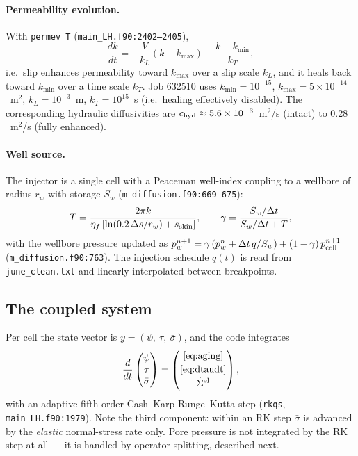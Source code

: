 \documentclass[11pt]{article}
\newcommand{\code}[1]{\texttt{#1}}
\newcommand{\sigeff}{\bar{\sigma}}
\newcommand{\sigtot}{\Sigma}
\begin{document}
\paragraph{Permeability evolution.} With \code{permev T}
(\code{main\_LH.f90:2402--2405}),
\begin{equation}
  \frac{dk}{dt} = -\frac{V}{k_L}\left(k - k_{\max}\right)
                  - \frac{k - k_{\min}}{k_T},
  \label{eq:permev}
\end{equation}
i.e.\ slip enhances permeability toward $k_{\max}$ over a slip scale $k_L$,
and it heals back toward $k_{\min}$ over a time scale $k_T$. Job 632510 uses
$k_{\min}=10^{-15}$, $k_{\max}=5\times10^{-14}$~m$^2$, $k_L=10^{-3}$~m,
$k_T=10^{15}$~s (i.e.\ healing effectively disabled). The corresponding
hydraulic diffusivities are $c_{\rm hyd}\approx 5.6\times10^{-3}$~m$^2$/s
(intact) to $0.28$~m$^2$/s (fully enhanced).

\paragraph{Well source.} The injector is a single cell with a Peaceman
well-index coupling to a wellbore of radius $r_w$ with storage $S_w$
(\code{m\_diffusion.f90:669--675}):
\begin{equation}
  T = \frac{2\pi k}{\eta_f\left[\ln(0.2\,\Delta s/r_w) + s_{\rm skin}\right]},
  \qquad
  \gamma = \frac{S_w/\Delta t}{S_w/\Delta t + T},
\end{equation}
with the wellbore pressure updated as
$p_w^{n+1} = \gamma\left(p_w^{n} + \Delta t\, q/S_w\right)
             + (1-\gamma)\,p^{n+1}_{\rm cell}$
(\code{m\_diffusion.f90:763}). The injection schedule $q(t)$ is read from
\code{june\_clean.txt} and linearly interpolated between breakpoints.

\subsection{The coupled system}

Per cell the state vector is $y = (\psi,\ \tau,\ \sigeff)$, and the code
integrates
\begin{equation}
  \frac{d}{dt}
  \begin{pmatrix}\psi\\ \tau\\ \sigeff\end{pmatrix}
  =
  \begin{pmatrix}
    \text{\eqref{eq:aging}} \\[2pt]
    \text{\eqref{eq:dtaudt}} \\[2pt]
    \dot\sigtot^{\rm el}
  \end{pmatrix},
  \label{eq:ode}
\end{equation}
with an adaptive fifth-order Cash--Karp Runge--Kutta step (\code{rkqs},
\code{main\_LH.f90:1979}). Note the third component: within an RK step
$\sigeff$ is advanced by the \emph{elastic} normal-stress rate only. Pore
pressure is not integrated by the RK step at all --- it is handled by
operator splitting, described next.
\end{document}
